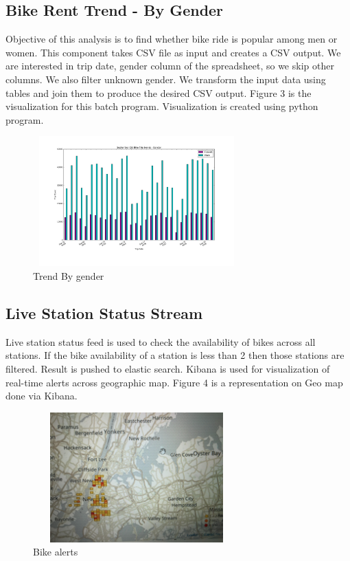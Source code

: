 \documentclass{sig-alternate-05-2015}
\begin{document}
\break
\subsection {Bike Rent Trend - By Gender}
Objective of this analysis is to find whether bike ride is popular among men or women. This component takes CSV file as input and creates a CSV output. We are interested in trip date, gender column of the spreadsheet, so we skip other columns. We also filter unknown gender. We transform the input data using tables
and join them to produce the desired CSV output. Figure 3 is the visualization for this batch program. Visualization is created using python program.

\begin{figure}[!ht]
\includegraphics[width=8cm, height=5cm]{tripsbygender}
 \caption{Trend By gender}\label{F:small}
\end{figure}
\subsection {Live Station Status Stream}
Live station status feed is used to check the availability of bikes across all stations. If the bike availability of a station is less than 2 then those stations are filtered. Result is pushed to elastic search. Kibana is used for visualization of real-time alerts across geographic map. Figure 4 is a representation on Geo map done via Kibana.

\begin{figure}[!ht]
\includegraphics[width=8cm, height=5cm]{bikealerts}
 \caption{Bike alerts}\label{F:small}
\end{figure}
\end{document}

